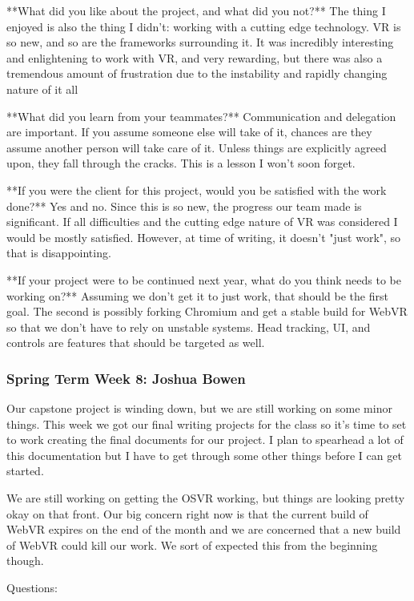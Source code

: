\documentclass[draftclsnofoot,onecolumn]{IEEEtran}
\begin{document}
**What did you like about the project, and what did you not?**
The thing I enjoyed is also the thing I didn't: working with a cutting edge technology. VR is so new, and so are the frameworks surrounding it. It was incredibly interesting and enlightening to work with VR, and very rewarding, but there was also a tremendous amount of frustration due to the instability and rapidly changing nature of it all

**What did you learn from your teammates?**
Communication and delegation are important. If you assume someone else will take of it, chances are they assume another person will take care of it. Unless things are explicitly agreed upon, they fall through the cracks. This is a lesson I won't soon forget. 

**If you were the client for this project, would you be satisfied with the work done?**
Yes and no. Since this is so new, the progress our team made is significant. If all difficulties and the cutting edge nature of VR was considered I would be mostly satisfied. However, at time of writing, it doesn't "just work", so that is disappointing. 

**If your project were to be continued next year, what do you think needs to be working on?**
Assuming we don't get it to just work, that should be the first goal. The second is possibly forking Chromium and get a stable build for WebVR so that we don't have to rely on unstable systems. Head tracking, UI, and controls are features that should be targeted as well.

\subsubsection{Spring Term Week 8: Joshua Bowen}

Our capstone project is winding down, but we are still working on some minor things. This week we got our final writing projects for the class so it's time to set to work creating the final documents for our project. I plan to spearhead a lot of this documentation but I have to get through some other things before I can get started.

We are still working on getting the OSVR working, but things are looking pretty okay on that front. Our big concern right now is that the current build of WebVR expires on the end of the month and we are concerned that a new build of WebVR could kill our work. We sort of expected this from the beginning though.

Questions:
\end{document}

